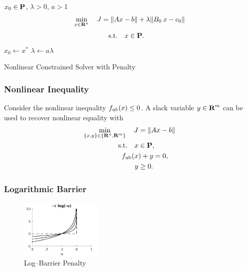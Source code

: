 \documentclass{article}
\begin{document}
    \begin{algorithm}[H]
        \SetAlgoLined
        $x_0 \in\textbf{P}$, $\lambda>0$, $a>1$\\
        \While{$\lambda<\lambda^\circ$}
        {
            {
                \begin{align*}
                    \min_{x\in\textbf{R}^n}\quad J = \|Ax-b\|+\lambda\|B_{0}\:x-c_{0}\|
                \end{align*}
                \begin{align*}
                    \text{s.t.} \quad &x\in\textbf{P}.
                \end{align*}
                $x_0\leftarrow x^*$
            }
            $\lambda\leftarrow a \lambda$
        } 
    \caption{Nonlinear Constrained Solver with Penalty}
    \label{algo:itc2}
    \end{algorithm}

    \subsubsection{Nonlinear Inequality}

    Consider the nonlinear inequality $f_{\text{ub}}(x)\leq 0$. 
    A slack variable $y\in\textbf{R}^m$ can be used to recover nonlinear equality with
    \begin{align*}
        \min_{\{x,y\}\in\{\textbf{R}^n,\textbf{R}^m\}} \quad J &= \|Ax-b\|\\
        \text{s.t.} \quad x&\in\textbf{P},\\
        f_{\text{ub}}(x&)+y =  0,\\
        y&\geq 0.
    \end{align*}

\clearpage

    \subsubsection{Logarithmic Barrier}
    \begin{figure}[h!]
        \centering
        \includegraphics[width=0.35\textwidth]{./figs/np/log_barrier.png}
        \caption{Log--Barrier Penalty}
        \label{fig:log_barrier}
    \end{figure}
\end{document}
